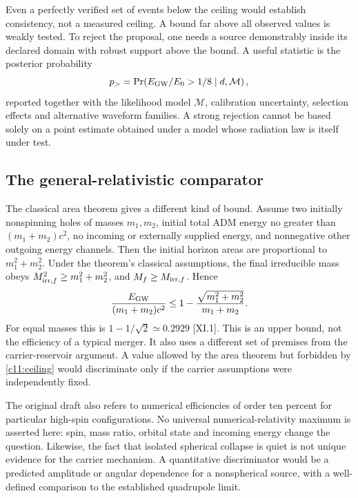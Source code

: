 Even a perfectly verified set of events below the ceiling would establish consistency, not a measured ceiling. A bound far above all observed values is weakly tested. To reject the proposal, one needs a source demonstrably inside its declared domain with robust support above the bound. A useful statistic is the posterior probability
\begin{equation}
 p_{>}=\Pr\!\left(E_{\rm GW}/E_0>1/8\mid d,\mathcal M\right),
 \label{c11:ceilingtest}
\end{equation}
reported together with the likelihood model $\mathcal M$, calibration uncertainty, selection effects and alternative waveform families. A strong rejection cannot be based solely on a point estimate obtained under a model whose radiation law is itself under test.

\subsection{The general-relativistic comparator}
The classical area theorem gives a different kind of bound. Assume two initially nonspinning holes of masses $m_1,m_2$, initial total ADM energy no greater than $(m_1+m_2)c^2$, no incoming or externally supplied energy, and nonnegative other outgoing energy channels. Then the initial horizon areas are proportional to $m_1^2+m_2^2$. Under the theorem's classical assumptions, the final irreducible mass obeys $M_{{\rm irr},f}^2\geq m_1^2+m_2^2$, and $M_f\geq M_{{\rm irr},f}$. Hence
\begin{equation}
 \frac{E_{\rm GW}}{(m_1+m_2)c^2}
 \leq 1-\frac{\sqrt{m_1^2+m_2^2}}{m_1+m_2}.
 \label{c11:areabound}
\end{equation}
For equal masses this is $1-1/\sqrt2\simeq0.2929$ [XI.1]. This is an upper bound, not the efficiency of a typical merger. It also uses a different set of premises from the carrier-reservoir argument. A value allowed by the area theorem but forbidden by \eqref{c11:ceiling} would discriminate only if the carrier assumptions were independently fixed.

The original draft also refers to numerical efficiencies of order ten percent for particular high-spin configurations. No universal numerical-relativity maximum is asserted here: spin, mass ratio, orbital state and incoming energy change the question. Likewise, the fact that isolated spherical collapse is quiet is not unique evidence for the carrier mechanism. A quantitative discriminator would be a predicted amplitude or angular dependence for a nonspherical source, with a well-defined comparison to the established quadrupole limit.

